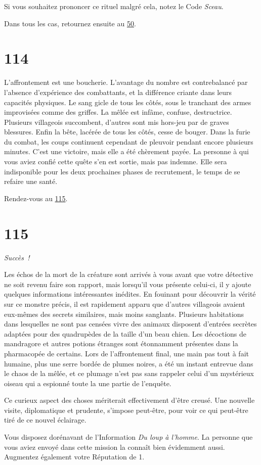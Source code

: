 \documentclass{report}
\newcommand{\gsection}[1]{
    \section{#1}
    \label{section-#1}
}
\newcommand{\glink}[1]{\hyperref[section-#1]{#1}}
\newcommand{\success}{\emph{Succès !}}
\begin{document}
Si vous souhaitez prononcer ce rituel malgré cela, notez le Code \emph{Sceau}.

Dans tous les cas, retournez ensuite au \glink{50}.

\gsection{114}

L'affrontement est une boucherie. L'avantage du nombre est contrebalancé par l'absence d'expérience des combattants, et la différence criante dans leurs capacités physiques. Le sang gicle de tous les côtés, sous le tranchant des armes improvisées comme des griffes. La mêlée est infâme, confuse, destructrice. Plusieurs villageois succombent, d'autres sont mis hors-jeu par de graves blessures. Enfin la bête, lacérée de tous les côtés, cesse de bouger. Dans la furie du combat, les coups continuent cependant de pleuvoir pendant encore plusieurs minutes. C'est une victoire, mais elle a été chèrement payée. 
La personne à qui vous aviez confié cette quête s'en est sortie, mais pas indemne. Elle sera indisponible pour les deux prochaines phases de recrutement, le temps de se refaire une santé.

Rendez-vous au \glink{115}.

\gsection{115}

\success

Les échos de la mort de la créature sont arrivés à vous avant que votre détective ne soit revenu faire son rapport, mais lorsqu'il vous présente celui-ci, il y ajoute quelques informations intéressantes inédites. En fouinant pour découvrir la vérité sur ce monstre précis, il est rapidement apparu que d'autres villageois avaient eux-mêmes des secrets similaires, mais moins sanglants. Plusieurs habitations dans lesquelles ne sont pas censées vivre des animaux disposent d'entrées secrètes adaptées pour des quadrupèdes de la taille d'un beau chien. Les décoctions de mandragore et autres potions étranges sont étonnamment présentes dans la pharmacopée de certains. Lors de l'affrontement final, une main pas tout à fait humaine, plus une serre bordée de plumes noires, a été un instant entrevue dans le chaos de la mêlée, et ce plumage n'est pas sans rappeler celui d'un mystérieux oiseau qui a espionné toute la une partie de l'enquête.

Ce curieux aspect des choses mériterait effectivement d'être creusé. Une nouvelle visite, diplomatique et prudente, s'impose peut-être, pour voir ce qui peut-être tiré de ce nouvel éclairage.

Vous disposez dorénavant de l'Information \emph{Du loup à l'homme}. La personne que vous aviez envoyé dans cette mission la connaît bien évidemment aussi. Augmentez également votre Réputation de 1.
\end{document}
